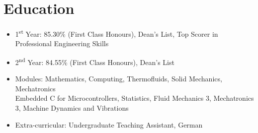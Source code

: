 \documentclass{cv}
\begin{document}
\section{Education}
\begin{subsections}
    \subtitle{SM Computational Science and Engineering \hfill Massachusetts, United States}

    \subtitle{MEng Mechanical Engineering \hfill London, United Kingdom}
    \begin{itemize}
        \item 1\textsuperscript{st} Year: 85.30\% (First Class Honours), Dean's List, Top Scorer in Professional Engineering Skills
        \item 2\textsuperscript{nd} Year: 84.55\% (First Class Honours), Dean's List
        \item Modules: Mathematics, Computing, Thermofluids, Solid Mechanics, Mechatronics \\ Embedded C for Microcontrollers, Statistics, Fluid Mechanics 3, Mechatronics 3, Machine Dynamics and Vibrations
        \item Extra-curricular: Undergraduate Teaching Assistant, German
    \end{itemize}
\end{subsections}
\end{document}
